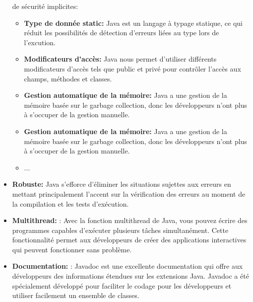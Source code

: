 \begin{itemize}
                de sécurité implicites:
                        \begin{itemize}
                                \item \textbf{Type de donnée static: } Java est un langage à typage statique, ce qui réduit les 
                                possibilités de détection d'erreurs liées au type lors de l'excution.
                                \item \textbf{ Modificateurs d'accès: } Java nous permet d'utiliser 
                                différents modificateurs d'accès tels que public et privé pour contrôler l'accès aux champs, 
                                méthodes et classes.
                                \item \textbf{Gestion automatique de la mémoire: } Java a une gestion de 
                                la mémoire basée sur le garbage collection, donc les développeurs n'ont plus à s'occuper de la
                                 gestion manuelle.
                                 \item \textbf{Gestion automatique de la mémoire: } Java a une gestion de 
                                la mémoire basée sur le garbage collection, donc les développeurs n'ont plus à s'occuper de la
                                 gestion manuelle.
                                 \item ... \cite{java}
                        \end{itemize}
                \item \textbf{Robuste: }  Java s'efforce d'éliminer les situations sujettes aux erreurs en mettant principalement l'accent 
                sur la vérification des erreurs au moment de la compilation et les tests d'exécution.
                \item \textbf{Multithread: }: Avec la fonction multithread de Java, vous pouvez écrire des programmes capables d'exécuter plusieurs 
                tâches simultanément. Cette fonctionnalité permet aux développeurs de créer des applications interactives qui peuvent 
                fonctionner sans problème.
                \item \textbf{Documentation: }: Javadoc est une excellente documentation qui offre aux développeurs des informations étendues sur les extensions Java.
                Javadoc a été spécialement développé pour faciliter le codage pour les développeurs et utiliser facilement un ensemble de classes.
                
        \end{itemize}
